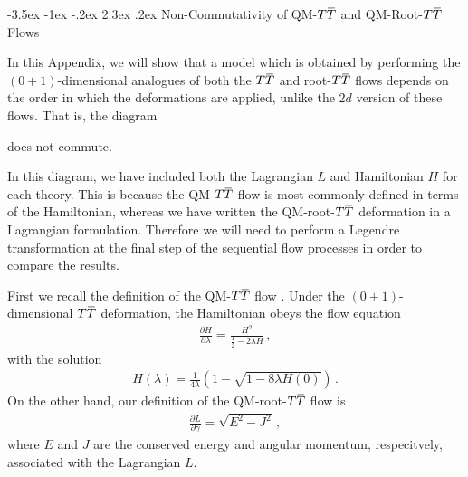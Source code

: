 \documentclass[12pt]{article}
\makeatletter
\numberwithin{equation}{section}
\renewcommand\section{\@startsection {section}{1}{\z@}%
                                   {-3.5ex \@plus -1ex \@minus -.2ex}%
                                   {2.3ex \@plus.2ex}%
                                   {\normalfont\large\bfseries}}
\newcommand{\overbar}[1]{\mkern 1.5mu\overline{\mkern-1.5mu#1\mkern-1.5mu}\mkern 1.5mu}
\def\TT{{T\overbar{T}}}
\makeatother
\begin{document}
\appendix

\section{Non-Commutativity of QM-$\TT$ and QM-Root-$\TT$ Flows}\label{app:other}

In this Appendix, we will show that a model which is obtained by performing the $(0+1)$-dimensional analogues of both the $\TT$ and root-$\TT$ flows depends on the order in which the deformations are applied, unlike the $2d$ version of these flows. That is, the diagram
%
\begin{center}
\end{center}
%
does not commute.

In this diagram, we have included both the Lagrangian $L$ and Hamiltonian $H$ for each theory. This is because the QM-$\TT$ flow is most commonly defined in terms of the Hamiltonian, whereas we have written the QM-root-$\TT$ deformation in a Lagrangian formulation. Therefore we will need to perform a Legendre transformation at the final step of the sequential flow processes in order to compare the results.

First we recall the definition of the QM-$\TT$ flow \cite{Gross:2019ach,Gross:2019uxi}. Under the $(0+1)$-dimensional $\TT$ deformation, the Hamiltonian obeys the flow equation
%
\begin{align}\label{QM_TT_Hamiltonian}
    \frac{\partial H}{\partial \lambda} = \frac{H^2}{\frac{1}{2} - 2 \lambda H} \, , 
\end{align}
%
with the solution
%
\begin{align}\label{QM_TT_deformed_hamiltonian}
    H ( \lambda ) = \frac{1}{4 \lambda} \left( 1 - \sqrt{ 1 - 8 \lambda H ( 0 ) } \right) \, .
\end{align}
%
On the other hand, our definition of the QM-root-$\TT$ flow is
%
\begin{align}
    \frac{\partial L}{\partial \gamma} = \sqrt{ E^2 - J^2 } \, ,
\end{align}
%
where $E$ and $J$ are the conserved energy and angular momentum, respecitvely, associated with the Lagrangian $L$.
\end{document}
